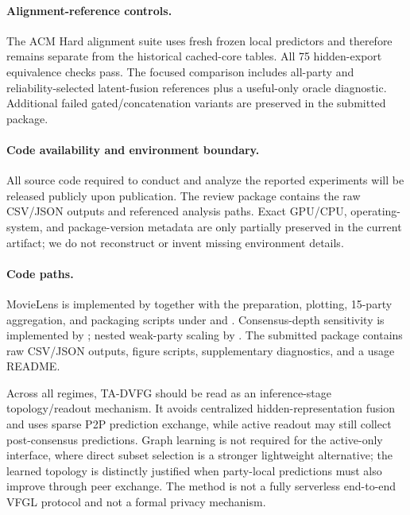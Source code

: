 \documentclass[letterpaper]{article}
\newcommand{\method}{\textsc{TA-DVFG}}
\begin{document}
\paragraph{Alignment-reference controls.}
The ACM Hard alignment suite uses fresh frozen local predictors and therefore
remains separate from the historical cached-core tables. All 75 hidden-export
equivalence checks pass. The focused comparison includes all-party and
reliability-selected latent-fusion references plus a useful-only oracle
diagnostic. Additional failed gated/concatenation variants are preserved in the
submitted package.

\paragraph{Code availability and environment boundary.}
All source code required to conduct and analyze the reported experiments will be
released publicly upon publication. The review package contains the raw
CSV/JSON outputs and referenced analysis paths. Exact GPU/CPU, operating-system,
and package-version metadata are only partially preserved in the current
artifact; we do not reconstruct or invent missing environment details.

\paragraph{Code paths.}
MovieLens is implemented by
 together with the
preparation, plotting, 15-party aggregation, and packaging scripts under
 and .
Consensus-depth sensitivity is implemented by
; nested weak-party scaling by
. The submitted package contains
raw CSV/JSON outputs, figure scripts, supplementary diagnostics, and a usage
README.

Across all regimes, \method{} should be read as an inference-stage
topology/readout mechanism. It avoids centralized hidden-representation fusion
and uses sparse P2P prediction exchange, while active readout may still collect
post-consensus predictions. Graph learning is not required for the active-only
interface, where direct subset selection is a stronger lightweight alternative;
the learned topology is distinctly justified when party-local predictions must
also improve through peer exchange. The method is not a fully serverless
end-to-end VFGL protocol and not a formal privacy mechanism.
\end{document}
